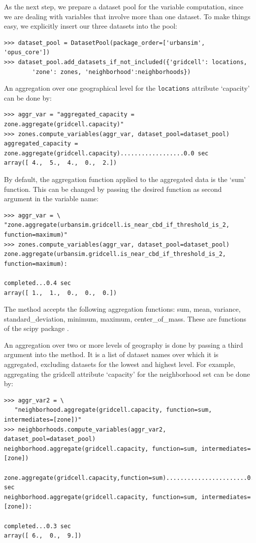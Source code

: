 As the next step, we prepare a dataset pool  for the variable computation, since we are dealing with variables
that involve more than one dataset. To make things easy, we explicitly insert
our three datasets into the pool:
\begin{verbatim}
>>> dataset_pool = DatasetPool(package_order=['urbansim', 'opus_core'])
>>> dataset_pool.add_datasets_if_not_included({'gridcell': locations,
        'zone': zones, 'neighborhood':neighborhoods})
\end{verbatim}
An aggregation over one geographical level for the \verb|locations|
attribute \attributesindex `capacity' can be done by: \variablesindex
\attributesindex
\begin{verbatim}
>>> aggr_var = "aggregated_capacity = zone.aggregate(gridcell.capacity)"
>>> zones.compute_variables(aggr_var, dataset_pool=dataset_pool)
aggregated_capacity = zone.aggregate(gridcell.capacity)..................0.0 sec
array([ 4.,  5.,  4.,  0.,  2.])
\end{verbatim}
By default, the aggregation function applied to the aggregated data is the
`sum' function. This can be changed by passing the desired function as second
argument in the variable \variablesindex name: \variablesindex
\begin{verbatim}
>>> aggr_var = \
"zone.aggregate(urbansim.gridcell.is_near_cbd_if_threshold_is_2, function=maximum)"
>>> zones.compute_variables(aggr_var, dataset_pool=dataset_pool)
zone.aggregate(urbansim.gridcell.is_near_cbd_if_threshold_is_2, function=maximum):
                                                            completed...0.4 sec
array([ 1.,  1.,  0.,  0.,  0.])
\end{verbatim}

The  method accepts the following aggregation functions:
sum, mean, variance, standard_deviation, minimum, maximum,
center_of_mass. These are functions of the scipy package
.

An aggregation over two or more levels of geography is done by passing a
third argument into the \class{aggregate} method. It is a list of dataset
\datasetindex names over which it is aggregated, excluding datasets
\datasetindex for the lowest and highest level. For example, aggregating
the gridcell attribute \attributesindex `capacity' for the neighborhood set
can be done by: \variablesindex \attributesindex
\begin{verbatim}
>>> aggr_var2 = \
   "neighborhood.aggregate(gridcell.capacity, function=sum, intermediates=[zone])"
>>> neighborhoods.compute_variables(aggr_var2, dataset_pool=dataset_pool)
neighborhood.aggregate(gridcell.capacity, function=sum, intermediates=[zone])
    zone.aggregate(gridcell.capacity,function=sum).......................0.0 sec
neighborhood.aggregate(gridcell.capacity, function=sum, intermediates=[zone]):
                                                            completed...0.3 sec
array([ 6.,  0.,  9.])
\end{verbatim}

